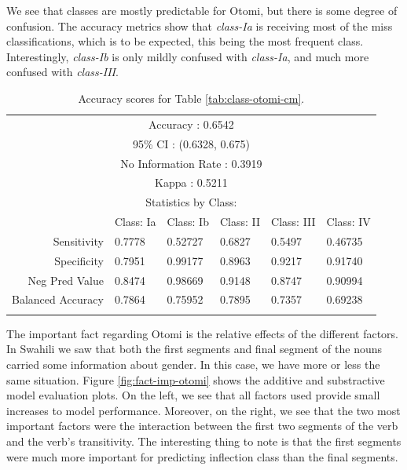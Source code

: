 We see that classes are mostly predictable for Otomi, but there is some degree of confusion. The accuracy metrics show that \textit{class-Ia} is receiving most of the miss classifications, which is to be expected, this being the most frequent class. Interestingly, \textit{class-Ib} is only mildly confused with \textit{class-Ia}, and much more confused with \textit{class-III}.

\begin{table}[!htpb]
  \centering
  \begin{tabular}{rlllll}
    \lsptoprule
    \multicolumn{6}{c}{Overall Statistics}                                         \\
    \midrule
    \multicolumn{6}{c}{Accuracy : 0.6542}                                          \\
    \multicolumn{6}{c}{95\% CI : (0.6328, 0.675)}                                  \\
    \multicolumn{6}{c}{No Information Rate : 0.3919}                               \\
    \multicolumn{6}{c}{Kappa : 0.5211}                                             \\
    \midrule
    \multicolumn{6}{c}{Statistics by Class:}                                       \\
    \midrule
                      & Class: Ia & Class: Ib & Class: II & Class: III & Class: IV \\
    Sensitivity       & 0.7778    & 0.52727   & 0.6827    & 0.5497     & 0.46735   \\
    Specificity       & 0.7951    & 0.99177   & 0.8963    & 0.9217     & 0.91740   \\
    Neg Pred Value    & 0.8474    & 0.98669   & 0.9148    & 0.8747     & 0.90994   \\
    Balanced Accuracy & 0.7864    & 0.75952   & 0.7895    & 0.7357     & 0.69238   \\
    \lspbottomrule
  \end{tabular}
  \caption{Accuracy scores for Table \ref{tab:class-otomi-cm}.}\label{tab:class-otomi-stats}
\end{table}


The important fact regarding Otomi is the relative effects of the different factors. In Swahili we saw that both the first segments and final segment of the nouns carried some information about gender. In this case, we have more or less the same situation. Figure \ref{fig:fact-imp-otomi} shows the additive and substractive model evaluation plots. On the left, we see that all factors used provide small increases to model performance. Moreover, on the right, we see that the two most important factors were the interaction between the first two segments of the verb and the verb's transitivity. The interesting thing to note is that the first segments were much more important for predicting inflection class than the final segments.


